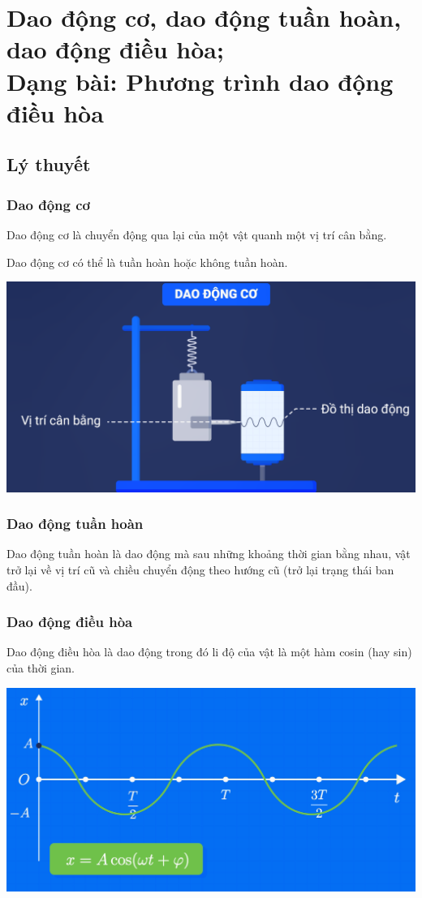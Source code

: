
\chapter[Dao động cơ, dao động tuần hoàn, dao động điều hòa;\\
Dạng bài: Phương trình dao động điều hòa]{Dao động cơ, dao động tuần hoàn, dao động điều hòa;\\Dạng bài: Phương trình dao động điều hòa}
\section{Lý thuyết}
\subsection{Dao động cơ}
Dao động cơ là chuyển động qua lại của một vật quanh một vị trí cân bằng.

Dao động cơ có thể là tuần hoàn hoặc không tuần hoàn.
\begin{center}
	\includegraphics[scale=0.35]{../figs/VN12-PH-02-L-001-1-V2-1}
\end{center}
\subsection{Dao động tuần hoàn}
Dao động tuần hoàn là dao động mà sau những khoảng thời gian bằng nhau, vật trở lại về vị trí cũ và chiều chuyển động theo hướng cũ (trở lại trạng thái ban đầu).
\subsection{Dao động điều hòa}
Dao động điều hòa là dao động trong đó li độ của vật là một hàm cosin (hay sin) của thời gian.
\begin{center}
	\includegraphics[scale=0.4]{../figs/VN12-PH-02-L-001-1-V2-2}
\end{center}
